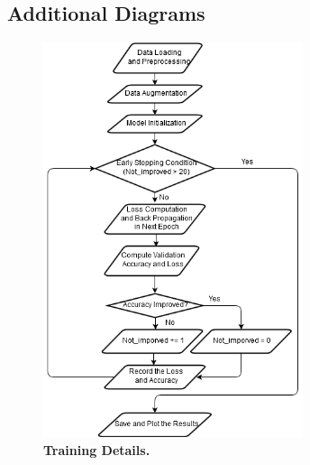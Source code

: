 \documentclass{article}
\newcommand{\mycaption}[2]{\caption[#1]{\textbf{#1.} #2}}
\begin{document}
\begin{multicols}{2}
\subsection{Additional Diagrams}
\begin{figure}[H] 
\includegraphics[width=3in]{imgs/training_flowchart.png}  \mycaption{Training Details}{}  
\label{fig:training flowchart}\end{figure}
\end{multicols}


\newpage



\end{document}
